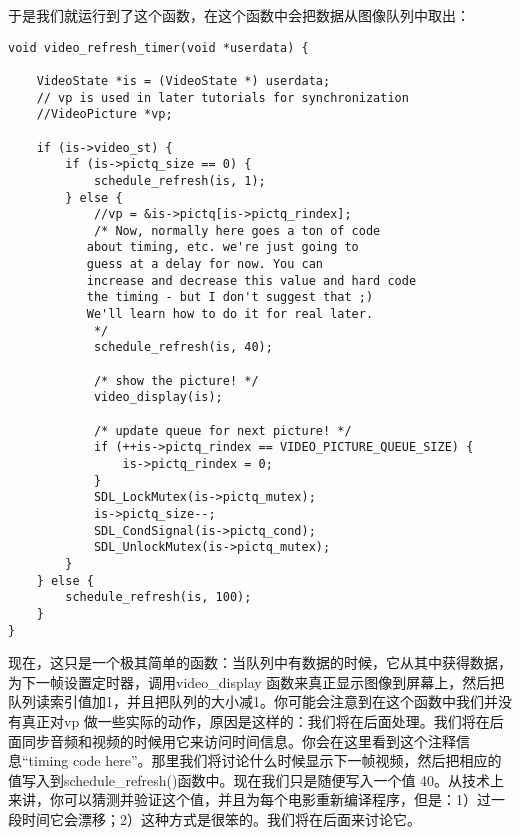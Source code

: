 于是我们就运行到了这个函数，在这个函数中会把数据从图像队列中取出：
\begin{lstlisting}
void video_refresh_timer(void *userdata) {

    VideoState *is = (VideoState *) userdata;
    // vp is used in later tutorials for synchronization
    //VideoPicture *vp;

    if (is->video_st) {
        if (is->pictq_size == 0) {
            schedule_refresh(is, 1);
        } else {
            //vp = &is->pictq[is->pictq_rindex];
            /* Now, normally here goes a ton of code
           about timing, etc. we're just going to
           guess at a delay for now. You can
           increase and decrease this value and hard code
           the timing - but I don't suggest that ;)
           We'll learn how to do it for real later.
            */
            schedule_refresh(is, 40);

            /* show the picture! */
            video_display(is);

            /* update queue for next picture! */
            if (++is->pictq_rindex == VIDEO_PICTURE_QUEUE_SIZE) {
                is->pictq_rindex = 0;
            }
            SDL_LockMutex(is->pictq_mutex);
            is->pictq_size--;
            SDL_CondSignal(is->pictq_cond);
            SDL_UnlockMutex(is->pictq_mutex);
        }
    } else {
        schedule_refresh(is, 100);
    }
}
\end{lstlisting}

现在，这只是一个极其简单的函数：当队列中有数据的时候，它从其中获得数据，为下一帧设置定时器，调用video_display 函数来真正显示图像到屏幕上，然后把队列读索引值加1，并且把队列的大小减1。你可能会注意到在这个函数中我们并没有真正对vp 做一些实际的动作，原因是这样的：我们将在后面处理。我们将在后面同步音频和视频的时候用它来访问时间信息。你会在这里看到这个注释信息“timing code here”。那里我们将讨论什么时候显示下一帧视频，然后把相应的值写入到schedule_refresh()函数中。现在我们只是随便写入一个值 40。从技术上来讲，你可以猜测并验证这个值，并且为每个电影重新编译程序，但是：1）过一段时间它会漂移；2）这种方式是很笨的。我们将在后面来讨论它。


